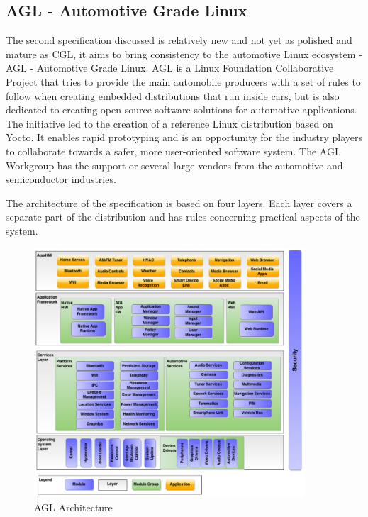 \subsection{AGL - Automotive Grade Linux}
The second specification discussed is relatively new and not yet as polished and mature as CGL, it aims to bring consistency to the automotive Linux ecosystem - AGL - Automotive Grade Linux. AGL is a Linux Foundation Collaborative Project that tries to provide the main automobile producers with a set of rules to follow when creating  embedded distributions that run inside cars, but is also dedicated to creating open source software solutions for automotive applications. The initiative led to the creation of a reference Linux distribution based on Yocto. It enables rapid prototyping and is an opportunity for the industry players to collaborate towards a safer, more user-oriented software system. The AGL Workgroup has the support or several large vendors from the automotive and semiconductor industries.

The architecture of the specification is based on four layers. Each layer covers a separate part of the distribution and has rules concerning practical aspects of the system.

\begin{figure}[h!]
  \centering
	\includegraphics[width=0.9\textwidth]{images/agl_arch.jpg}
    \caption{AGL Architecture}
\end{figure}

